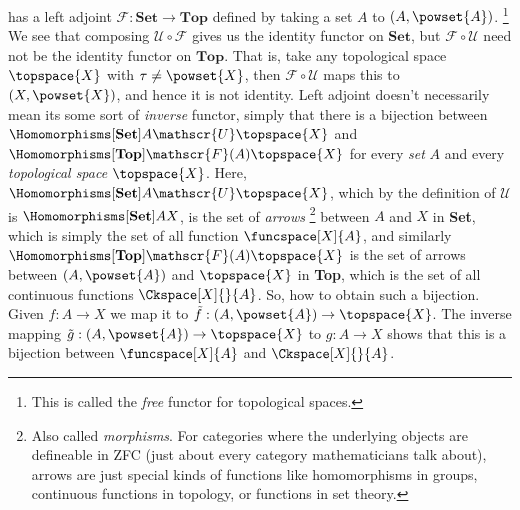 \documentclass{book}                                                           %
\begin{document}
                has a left adjoint $\mathscr{F}:\mathbf{Set}\rightarrow\mathbf{Top}$
                defined by taking a set $A$ to $(A,\powset{A})$.%
                \footnote{%
                    This is called the \textit{free} functor for topological
                    spaces.
                }
                We see that composing $\mathscr{U}\circ\mathscr{F}$ gives us
                the identity functor on $\mathbf{Set}$, but
                $\mathscr{F}\circ\mathscr{U}$ need not be the identity functor
                on $\mathbf{Top}$. That is, take any topological space
                $\topspace{X}$ with $\tau\ne\powset{X}$, then
                $\mathscr{F}\circ\mathscr{U}$ maps this to $(X,\powset{X})$, and
                hence it is not identity. Left adjoint doesn't necessarily mean
                its some sort of \textit{inverse} functor, simply that there is
                a bijection between
                $\Homomorphisms[\textbf{Set}]{A}{\mathscr{U}\topspace{X}}$
                and $\Homomorphisms[\textbf{Top}]{\mathscr{F}(A)}{\topspace{X}}$
                for every \textit{set} $A$ and every \textit{topological space}
                $\topspace{X}$. Here,
                $\Homomorphisms[\textbf{Set}]{A}{\mathscr{U}\topspace{X}}$,
                which by the definition of $\mathscr{U}$ is
                $\Homomorphisms[\textbf{Set}]{A}{X}$, is the set of \textit{arrows}%
                \footnote{%
                    Also called \textit{morphisms}. For categories where the
                    underlying objects are defineable in ZFC (just about every
                    category mathematicians talk about), arrows are just special
                    kinds of functions like homomorphisms in groups, continuous
                    functions in topology, or functions in set theory.
                }
                between $A$ and $X$ in \textbf{Set}, which is simply the set of
                all function $\funcspace[X]{A}$, and similarly
                $\Homomorphisms[\textbf{Top}]{\mathscr{F}(A)}{\topspace{X}}$ is
                the set of arrows between $(A,\powset{A})$ and $\topspace{X}$ in
                \textbf{Top}, which is the set of all continuous functions
                $\Ckspace[X]{}{A}$. So, how to obtain such a bijection. Given
                $f:A\rightarrow{X}$ we map it to
                $\tilde{f}:(A,\powset{A})\rightarrow\topspace{X}$. The inverse
                mapping $\tilde{g}:(A,\powset{A})\rightarrow\topspace{X}$ to
                $g:A\rightarrow{X}$ shows that this is a bijection between
                $\funcspace[X]{A}$ and $\Ckspace[X]{}{A}$.
\end{document}
